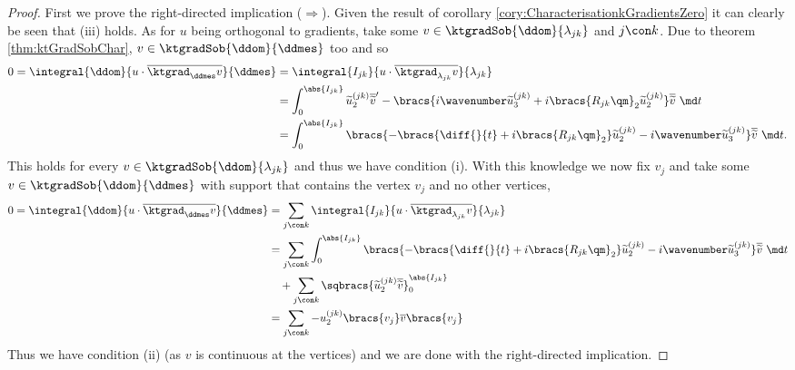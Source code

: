 \begin{proof}
	First we prove the right-directed implication ($\Rightarrow$).
	Given the result of corollary \ref{cory:CharacterisationkGradientsZero} it can clearly be seen that (iii) holds.
	As for $u$ being orthogonal to gradients, take some $v\in\ktgradSob{\ddom}{\lambda_{jk}}$ and $j\con k$.
	Due to theorem \ref{thm:ktGradSobChar}, $v\in\ktgradSob{\ddom}{\ddmes}$ too and so
	\begin{align*}
		0 = \integral{\ddom}{u\cdot\overline{\ktgrad_\ddmes v}}{\ddmes}
		&= \integral{I_{jk}}{u\cdot\overline{\ktgrad_{\lambda_{jk}} v}}{\lambda_{jk}} \\
		&= \int_0^{\abs{I_{jk}}} \widetilde{u}_2^{(jk)}\overline{\widetilde{v}}' - \bracs{i\wavenumber\widetilde{u}_3^{(jk)} + i\bracs{R_{jk}\qm}_2\widetilde{u}_2^{(jk)}}\overline{\widetilde{v}} \ \md t \\
		&= \int_0^{\abs{I_{jk}}} \bracs{-\bracs{\diff{}{t} + i\bracs{R_{jk}\qm}_2}\widetilde{u}^{(jk)}_2 - i\wavenumber\widetilde{u}^{(jk)}_3}\overline{\widetilde{v}} \ \md t.
	\end{align*}
	This holds for every $v\in\ktgradSob{\ddom}{\lambda_{jk}}$ and thus we have condition (i).
	With this knowledge we now fix $v_j$ and take some $v\in\ktgradSob{\ddom}{\ddmes}$ with support that contains the vertex $v_j$ and no other vertices,
	\begin{align*}
		0 = \integral{\ddom}{u\cdot\overline{\ktgrad_\ddmes v}}{\ddmes}
		&= \sum_{j\con k}\integral{I_{jk}}{u\cdot\overline{\ktgrad_{\lambda_{jk}} v}}{\lambda_{jk}} \\
		&= \sum_{j\con k}\int_0^{\abs{I_{jk}}} \bracs{-\bracs{\diff{}{t} + i\bracs{R_{jk}\qm}_2}\widetilde{u}^{(jk)}_2 - i\wavenumber\widetilde{u}^{(jk)}_3}\overline{\widetilde{v}} \ \md t \\
		& \quad + \sum_{j\con k}\sqbracs{\widetilde{u}_2^{(jk)}\overline{\widetilde{v}}}_0^{\abs{I_{jk}}} \\
		&= \sum_{j\con k} - u_2^{(jk)}\bracs{v_j}\overline{v}\bracs{v_j}
	\end{align*}
	Thus we have condition (ii) (as $v$ is continuous at the vertices) and we are done with the right-directed implication. \newline
	

\end{proof}
